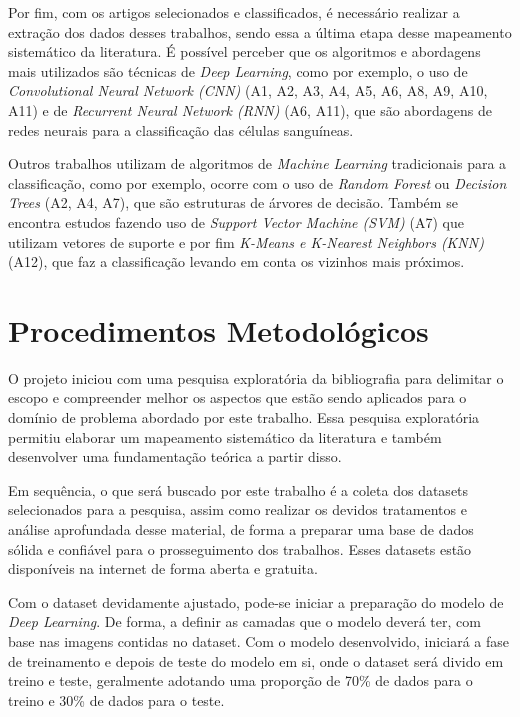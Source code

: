 Por fim, com os artigos selecionados e classificados, é necessário realizar a extração dos dados desses trabalhos, sendo essa a última etapa desse mapeamento sistemático da literatura. É possível perceber que os algoritmos e abordagens mais utilizados são técnicas de \emph{Deep Learning}, como por exemplo, o uso de \emph{Convolutional Neural Network (CNN)} (A1, A2, A3, A4, A5, A6, A8, A9, A10, A11) e de \emph{Recurrent Neural Network (RNN)} (A6, A11), que são abordagens de redes neurais para a classificação das células sanguíneas.

Outros trabalhos utilizam de algoritmos de \emph{Machine Learning} tradicionais para a classificação, como por exemplo, ocorre com o uso de \emph{Random Forest} ou \emph{Decision Trees}  (A2, A4, A7), que são estruturas de árvores de decisão. Também se encontra estudos fazendo uso de \emph{Support Vector Machine (SVM)} (A7) que utilizam vetores de suporte e por fim \emph{K-Means e K-Nearest Neighbors (KNN)} (A12), que faz a classificação levando em conta os vizinhos mais próximos.

\chapter{Procedimentos Metodológicos}
\label{chap:metodologia}


O projeto iniciou com uma pesquisa exploratória da bibliografia para delimitar o escopo e compreender melhor os aspectos que estão sendo aplicados para o domínio de problema abordado por este trabalho. Essa pesquisa exploratória permitiu elaborar um mapeamento sistemático da literatura e também desenvolver uma fundamentação teórica a partir disso.

Em sequência, o que será buscado por este trabalho é a coleta dos datasets selecionados para a pesquisa, assim como realizar os devidos tratamentos e análise aprofundada desse material, de forma a preparar uma base de dados sólida e confiável para o prosseguimento dos trabalhos. Esses datasets estão disponíveis na internet de forma aberta e gratuita.

Com o dataset devidamente ajustado, pode-se iniciar a preparação do modelo de \emph{Deep Learning}. De forma, a definir as camadas que o modelo deverá ter, com base nas imagens contidas no dataset. Com o modelo desenvolvido, iniciará a fase de treinamento e depois de teste do modelo em si, onde o dataset será divido em treino e teste, geralmente adotando uma proporção de 70\% de dados para o treino e 30\% de dados para o teste.

